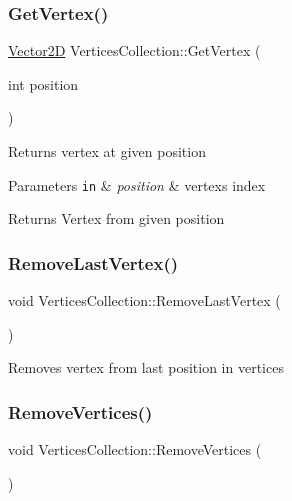 \subsubsection{\texorpdfstring{Get\+Vertex()}{GetVertex()}}
{\footnotesize\ttfamily \hyperlink{Vector2D_8h_a2a0274942d24318d2654bd0f75c54fb7}{Vector2D} Vertices\+Collection\+::\+Get\+Vertex (\begin{DoxyParamCaption}\item[{int}]{position }\end{DoxyParamCaption})}

Returns vertex at given position 
\begin{DoxyParams}[1]{Parameters}
\mbox{\tt in}  & {\em position} & vertex\textquotesingle{}s index \\
\hline
\end{DoxyParams}
\begin{DoxyReturn}{Returns}
Vertex from given position 
\end{DoxyReturn}
\mbox{\label{classVerticesCollection_ad0c22e7014760ba1cf5c15230657fa81}} 
\subsubsection{\texorpdfstring{Remove\+Last\+Vertex()}{RemoveLastVertex()}}
{\footnotesize\ttfamily void Vertices\+Collection\+::\+Remove\+Last\+Vertex (\begin{DoxyParamCaption}{ }\end{DoxyParamCaption})}

Removes vertex from last position in vertices \mbox{\label{classVerticesCollection_a92a341f41b621dad57b7ab74265f1a14}} 
\subsubsection{\texorpdfstring{Remove\+Vertices()}{RemoveVertices()}}
{\footnotesize\ttfamily void Vertices\+Collection\+::\+Remove\+Vertices (\begin{DoxyParamCaption}{ }\end{DoxyParamCaption})}

